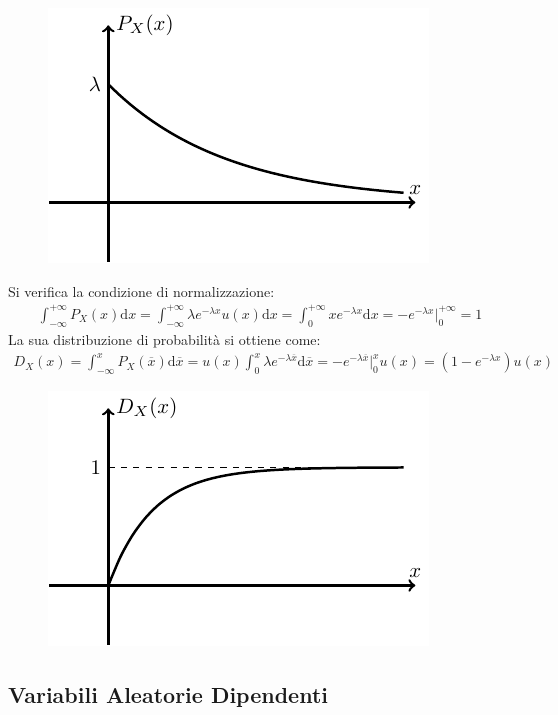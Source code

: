 \documentclass{article}
\newcommand{\df}{\mathrm{d}}
\numberwithin{equation}{subsection}
\begin{document}
\begin{figure}[H]%
    \centering
    \includegraphics{laplaciana.pdf}%
\end{figure}
Si verifica la condizione di normalizzazione:
\begin{gather*}
    \displaystyle\int_{-\infty}^{+\infty}P_X(x)\df x=\int_{-\infty}^{+\infty}\lambda e^{-\lambda x}u(x)\df x=\int_0^{+\infty}xe^{-\lambda x}\df x=-e^{-\lambda x}\Bigg|_0^{+\infty}=1
\end{gather*}
La sua distribuzione di probabilità si ottiene come:
\begin{gather*}
    D_X(x)=\displaystyle\int_{-\infty}^xP_X(\overline{x})\df\overline{x}=u(x)\int_0^x\lambda e^{-\lambda\overline{x}}\df\overline{x}=-e^{-\lambda\overline{x}}\Bigg|_0^xu(x)=\left(1-e^{-\lambda x}\right)u(x)
\end{gather*}
\begin{figure}[H]%
    \centering
    \includegraphics{laplaciana-2.pdf}%
\end{figure}

\subsection{Variabili Aleatorie Dipendenti}
\end{document}
